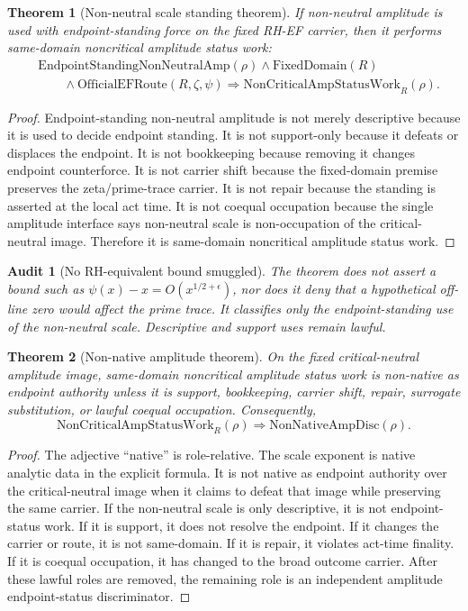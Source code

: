 \documentclass[11pt]{article}
\newtheorem{theorem}{Theorem}[section]
\newtheorem{audit}{Audit}[section]
\newcommand{\FixedDomain}{\mathrm{FixedDomain}}
\newcommand{\OfficialEFRoute}{\mathrm{OfficialEFRoute}}
\newcommand{\NonCritAmpWork}{\mathrm{NonCriticalAmpStatusWork}}
\newcommand{\AmpStand}{\mathrm{EndpointStandingNonNeutralAmp}}
\newcommand{\NonNativeDisc}{\mathrm{NonNativeAmpDisc}}
\begin{document}
\begin{theorem}[Non-neutral scale standing theorem]
If non-neutral amplitude is used with endpoint-standing force on the fixed RH-EF carrier, then it performs same-domain noncritical amplitude status work:
\[
\begin{aligned}
&\AmpStand(\rho)\wedge \FixedDomain(R)\\
&\qquad\wedge \OfficialEFRoute(R,\zeta,\psi)
\Rightarrow \NonCritAmpWork_R(\rho).
\end{aligned}
\]
\end{theorem}

\begin{proof}
Endpoint-standing non-neutral amplitude is not merely descriptive because it is used to decide endpoint standing.  It is not support-only because it defeats or displaces the endpoint.  It is not bookkeeping because removing it changes endpoint counterforce.  It is not carrier shift because the fixed-domain premise preserves the zeta/prime-trace carrier.  It is not repair because the standing is asserted at the local act time.  It is not coequal occupation because the single amplitude interface says non-neutral scale is non-occupation of the critical-neutral image.  Therefore it is same-domain noncritical amplitude status work.
\end{proof}

\begin{audit}[No RH-equivalent bound smuggled]
The theorem does not assert a bound such as \(\psi(x)-x=O(x^{1/2+\epsilon})\), nor does it deny that a hypothetical off-line zero would affect the prime trace.  It classifies only the endpoint-standing use of the non-neutral scale.  Descriptive and support uses remain lawful.
\end{audit}

\begin{theorem}[Non-native amplitude theorem]
On the fixed critical-neutral amplitude image, same-domain noncritical amplitude status work is non-native as endpoint authority unless it is support, bookkeeping, carrier shift, repair, surrogate substitution, or lawful coequal occupation.  Consequently,
\[
\NonCritAmpWork_R(\rho)
\Rightarrow \NonNativeDisc(\rho).
\]
\end{theorem}

\begin{proof}
The adjective ``native'' is role-relative.  The scale exponent is native analytic data in the explicit formula.  It is not native as endpoint authority over the critical-neutral image when it claims to defeat that image while preserving the same carrier.  If the non-neutral scale is only descriptive, it is not endpoint-status work.  If it is support, it does not resolve the endpoint.  If it changes the carrier or route, it is not same-domain.  If it is repair, it violates act-time finality.  If it is coequal occupation, it has changed to the broad outcome carrier.  After these lawful roles are removed, the remaining role is an independent amplitude endpoint-status discriminator.
\end{proof}
\end{document}
